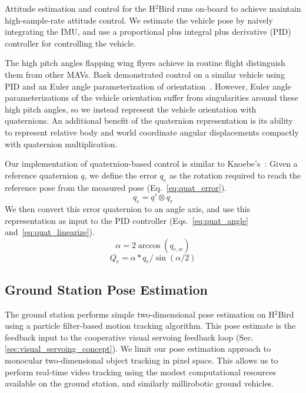\documentclass{aamas2013}
\begin{document}
Attitude estimation and control for the H$^2$Bird runs on-board to achieve 
maintain high-sample-rate attitude control. We estimate the vehicle pose by naively
integrating the IMU, and use a proportional plus integral plus derivative (PID) 
controller for controlling the vehicle.

The high pitch angles flapping wing flyers achieve in routine flight distinguish them 
from other MAVs. Baek demonstrated control on a similar vehicle using PID and an Euler angle
parameterization of orientation~\cite{baek:tracking}. However, Euler angle parameterizations of the vehicle orientation 
suffer from singularities around these high pitch angles, so we instead 
represent the vehicle orientation with quaternions. An additional benefit of 
the quaternion representation is its ability to represent relative body and 
world coordinate angular displacements compactly with quaternion 
multiplication.

Our implementation of quaternion-based control is similar to Knoebe's~\cite{knoebe:quatcontrol}:
Given a reference quaternion $q$, we define the error $q_e$ as the rotation 
required to reach the reference pose from the measured pose (Eq.~\ref{eq:quat_error}). 
\begin{equation}
\label{eq:quat_error}
q_e = q'\otimes q_r
\end{equation}
We then convert this error quaternion to an angle axis, and use this 
representation as input to the PID controller 
(Eqs.~\ref{eq:quat_angle} and~\ref{eq:quat_linearize}). 
\begin{equation}
\label{eq:quat_angle}
\alpha = 2\arccos(q_{e,w})
\end{equation}
\begin{equation}
\label{eq:quat_linearize}
Q_e = \alpha*q_e/\sin(\alpha /2)
\end{equation}

\subsection{Ground Station Pose Estimation}
The ground station performs simple two-dimensional pose estimation on 
H$^2$Bird using a particle filter-based motion tracking algorithm. This pose 
estimate is the feedback input to the cooperative visual servoing feedback 
loop (Sec. \ref{sec:visual_servoing_concept}). We limit our pose estimation 
approach to monocular two-dimensional object tracking in pixel space. This 
allows us to perform real-time video tracking using the modest computational 
resources available on the ground station, and similarly millirobotic ground 
vehicles.
\end{document}
